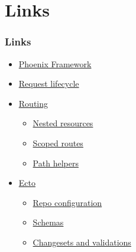 \section{Links}

\frame{\tableofcontents[currentsection]}

\begin{frame}
    \frametitle{Links}
    \begin{itemize}
        \item \href{https://hexdocs.pm/phoenix/Phoenix.html}{Phoenix Framework}
        \item \href{https://hexdocs.pm/phoenix/request_lifecycle.html}{Request lifecycle}
        \item \href{https://devhints.io/phoenix-routing}{Routing}
        \begin{itemize}
            \item \href{https://hexdocs.pm/phoenix/routing.html\#nested-resources}{Nested resources}
            \item \href{https://hexdocs.pm/phoenix/routing.html\#scoped-routes}{Scoped routes}
            \item \href{https://hexdocs.pm/phoenix/routing.html\#path-helpers}{Path helpers}
        \end{itemize}
        \item \href{https://hexdocs.pm/phoenix/ecto.html}{Ecto}
        \begin{itemize}
            \item \href{https://hexdocs.pm/phoenix/ecto.html\#repo-configuration}{Repo configuration}
            \item \href{https://hexdocs.pm/phoenix/ecto.html\#the-schema}{Schemas}
            \item \href{https://hexdocs.pm/phoenix/ecto.html\#changesets-and-validations}{Changesets and validations} 
        \end{itemize}
    \end{itemize}
\end{frame}
